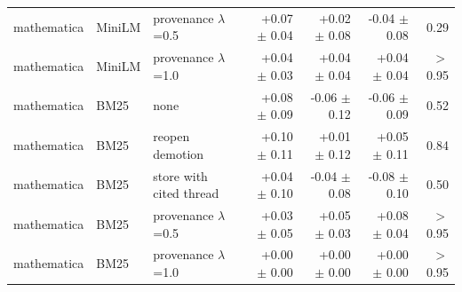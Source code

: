 \begin{tabular}{lllrrrr}
mathematica & MiniLM & provenance $\lambda$=0.5 & +0.07 $\pm$ 0.04 & +0.02 $\pm$ 0.08 & -0.04 $\pm$ 0.08 & 0.29 \\
mathematica & MiniLM & provenance $\lambda$=1.0 & +0.04 $\pm$ 0.03 & +0.04 $\pm$ 0.04 & +0.04 $\pm$ 0.04 & $>$0.95 \\
\midrule
mathematica & BM25 & none & +0.08 $\pm$ 0.09 & -0.06 $\pm$ 0.12 & -0.06 $\pm$ 0.09 & 0.52 \\
mathematica & BM25 & reopen demotion & +0.10 $\pm$ 0.11 & +0.01 $\pm$ 0.12 & +0.05 $\pm$ 0.11 & 0.84 \\
mathematica & BM25 & store with cited thread & +0.04 $\pm$ 0.10 & -0.04 $\pm$ 0.08 & -0.08 $\pm$ 0.10 & 0.50 \\
mathematica & BM25 & provenance $\lambda$=0.5 & +0.03 $\pm$ 0.05 & +0.05 $\pm$ 0.03 & +0.08 $\pm$ 0.04 & $>$0.95 \\
mathematica & BM25 & provenance $\lambda$=1.0 & +0.00 $\pm$ 0.00 & +0.00 $\pm$ 0.00 & +0.00 $\pm$ 0.00 & $>$0.95 \\
\bottomrule
\end{tabular}
